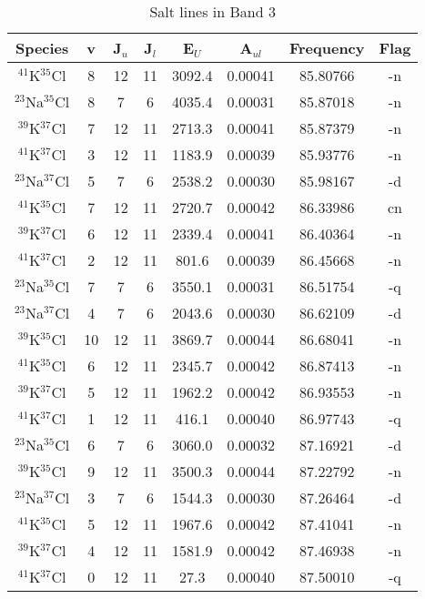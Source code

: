 \begin{table*}[htp]
\centering
\caption{Salt lines in Band 3}
\begin{tabular}{cccccccc}
\label{tab:all_detections_B3}
Species & v & J$_u$ & J$_l$ & E$_U$ & A$_{ul}$ & Frequency & Flag \\
\hline
$^{41}$K$^{35}$Cl & 8 & 12 & 11 & 3092.4 & 0.00041 & 85.80766 & -n \\
$^{23}$Na$^{35}$Cl & 8 & 7 & 6 & 4035.4 & 0.00031 & 85.87018 & -n \\
$^{39}$K$^{37}$Cl & 7 & 12 & 11 & 2713.3 & 0.00041 & 85.87379 & -n \\
$^{41}$K$^{37}$Cl & 3 & 12 & 11 & 1183.9 & 0.00039 & 85.93776 & -n \\
$^{23}$Na$^{37}$Cl & 5 & 7 & 6 & 2538.2 & 0.00030 & 85.98167 & -d \\
$^{41}$K$^{35}$Cl & 7 & 12 & 11 & 2720.7 & 0.00042 & 86.33986 & cn \\
$^{39}$K$^{37}$Cl & 6 & 12 & 11 & 2339.4 & 0.00041 & 86.40364 & -n \\
$^{41}$K$^{37}$Cl & 2 & 12 & 11 & 801.6 & 0.00039 & 86.45668 & -n \\
$^{23}$Na$^{35}$Cl & 7 & 7 & 6 & 3550.1 & 0.00031 & 86.51754 & -q \\
$^{23}$Na$^{37}$Cl & 4 & 7 & 6 & 2043.6 & 0.00030 & 86.62109 & -d \\
$^{39}$K$^{35}$Cl & 10 & 12 & 11 & 3869.7 & 0.00044 & 86.68041 & -n \\
$^{41}$K$^{35}$Cl & 6 & 12 & 11 & 2345.7 & 0.00042 & 86.87413 & -n \\
$^{39}$K$^{37}$Cl & 5 & 12 & 11 & 1962.2 & 0.00042 & 86.93553 & -n \\
$^{41}$K$^{37}$Cl & 1 & 12 & 11 & 416.1 & 0.00040 & 86.97743 & -q \\
$^{23}$Na$^{35}$Cl & 6 & 7 & 6 & 3060.0 & 0.00032 & 87.16921 & -d \\
$^{39}$K$^{35}$Cl & 9 & 12 & 11 & 3500.3 & 0.00044 & 87.22792 & -n \\
$^{23}$Na$^{37}$Cl & 3 & 7 & 6 & 1544.3 & 0.00030 & 87.26464 & -d \\
$^{41}$K$^{35}$Cl & 5 & 12 & 11 & 1967.6 & 0.00042 & 87.41041 & -n \\
$^{39}$K$^{37}$Cl & 4 & 12 & 11 & 1581.9 & 0.00042 & 87.46938 & -n \\
$^{41}$K$^{37}$Cl & 0 & 12 & 11 & 27.3 & 0.00040 & 87.50010 & -q \\

\end{tabular}
\end{table*}
